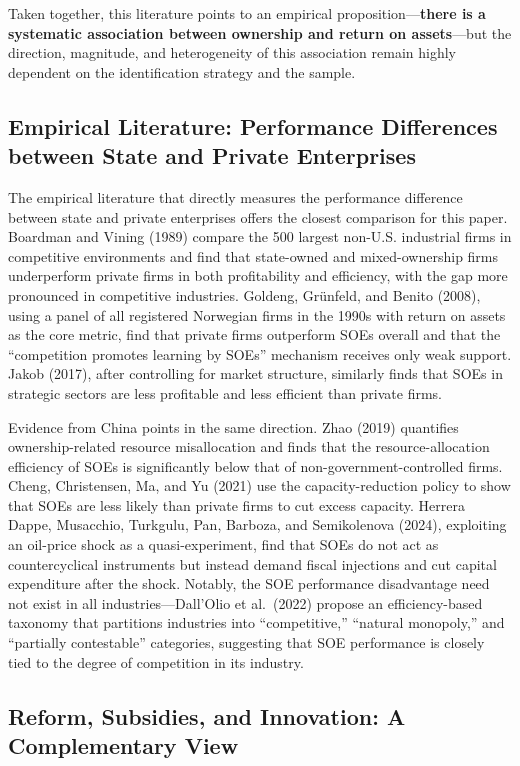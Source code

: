 \documentclass[11pt,a4paper]{article}
\begin{document}
Taken together, this literature points to an empirical proposition---\textbf{there is a systematic association between ownership and return on assets}---but the direction, magnitude, and heterogeneity of this association remain highly dependent on the identification strategy and the sample.

\subsection{Empirical Literature: Performance Differences between State and Private Enterprises}

The empirical literature that directly measures the performance difference between state and private enterprises offers the closest comparison for this paper. Boardman and Vining (1989) compare the 500 largest non-U.S. industrial firms in competitive environments and find that state-owned and mixed-ownership firms underperform private firms in both profitability and efficiency, with the gap more pronounced in competitive industries. Goldeng, Gr\"unfeld, and Benito (2008), using a panel of all registered Norwegian firms in the 1990s with return on assets as the core metric, find that private firms outperform SOEs overall and that the ``competition promotes learning by SOEs'' mechanism receives only weak support. Jakob (2017), after controlling for market structure, similarly finds that SOEs in strategic sectors are less profitable and less efficient than private firms.

Evidence from China points in the same direction. Zhao (2019) quantifies ownership-related resource misallocation and finds that the resource-allocation efficiency of SOEs is significantly below that of non-government-controlled firms. Cheng, Christensen, Ma, and Yu (2021) use the capacity-reduction policy to show that SOEs are less likely than private firms to cut excess capacity. Herrera Dappe, Musacchio, Turkgulu, Pan, Barboza, and Semikolenova (2024), exploiting an oil-price shock as a quasi-experiment, find that SOEs do not act as countercyclical instruments but instead demand fiscal injections and cut capital expenditure after the shock. Notably, the SOE performance disadvantage need not exist in all industries---Dall'Olio et al.\ (2022) propose an efficiency-based taxonomy that partitions industries into ``competitive,'' ``natural monopoly,'' and ``partially contestable'' categories, suggesting that SOE performance is closely tied to the degree of competition in its industry.

\subsection{Reform, Subsidies, and Innovation: A Complementary View}
\end{document}
